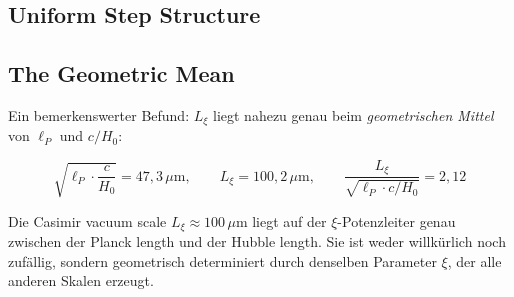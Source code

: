 \subsection{Uniform Step Structure}

\begin{table}[H]
    \centering
    \caption{Stufenabstände in der $\xi$-Potenzleiter}
    \label{tab:steps}
\end{table}

\subsection{The Geometric Mean}

Ein bemerkenswerter Befund: $L_\xi$ liegt nahezu genau beim
\emph{geometrischen Mittel} von $\ell_P$ und $c/H_0$:

\begin{equation}
    \sqrt{\ell_P \cdot \frac{c}{H_0}} = 47{,}3\,\mu\text{m},
    \qquad
    L_\xi = 100{,}2\,\mu\text{m},
    \qquad
    \frac{L_\xi}{\sqrt{\ell_P \cdot c/H_0}} = 2{,}12
    \label{eq:geom_mean}
\end{equation}

\begin{insightBox}
    Die Casimir vacuum scale $L_\xi \approx 100\,\mu\text{m}$ liegt auf der
    $\xi$-Potenzleiter genau zwischen der Planck length und der Hubble length.
    Sie ist weder willkürlich noch zufällig, sondern geometrisch determiniert
    durch denselben Parameter $\xi$, der alle anderen Skalen erzeugt.
\end{insightBox}

